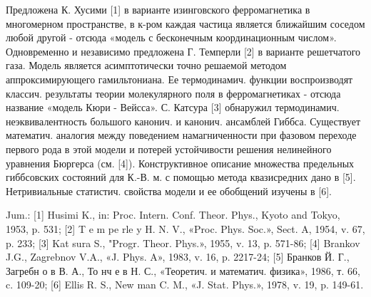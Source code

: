 \documentclass[10pt]{article}
\begin{document}
Предложена К. Хусими [1] в варианте изинговского ферромагнетика в многомерном пространстве, в к-ром каждая частица является ближайшим соседом любой другой - отсюда «модель с бесконечным координационным числом». Одновременно и независимо предложена Г. Темперли [2] в варианте решетчатого газа. Модель является асимптотически точно решаемой методом аппроксимирующего гамильтониана. Ее термодинамич. функции воспроизводят классич. результаты теории молекулярного поля в ферромагнетиках - отсюда название «модель Кюри - Вейсса». С. Катсура [3] обнаружил термодинамич. неэквивалентность большого канонич. и канонич. ансамблей Гиббса. Существует математич. аналогия между поведением намагниченности при фазовом переходе первого рода в этой модели и потерей устойчивости решения нелинейного уравнения Бюргерса (см. [4]). Конструктивное описание множества предельных гиббсовских состояний для К.-В. м. с помощью метода квазисредних дано в [5]. Нетривиальные статистич. свойства модели и ее обобщений изучены в [6].



Jum.: [1] Husimi K., in: Proc. Intern. Conf. Theor. Phys., Kyoto and Tokyo, 1953, p. 531; [2] T e m pe rle y H. N. V., «Proc. Phys. Soc.», Sect. A, 1954, v. 67, p. 233; [3] Kat sura S., "Progr. Theor. Phys.», 1955, v. 13, p. 571-86; [4] Brankov J.G., Zagrebnov V.A., «J. Phys. A», 1983, v. 16, p. 2217-24; [5] Бранков Й. Г., Загребн о в В. А., То нч е в Н. С., «Теоретич. и математич. физика», 1986, т. 66, c. 109-20; [6] Ellis R. S., New man C. M., «J. Stat. Phys.», 1978, v. 19, p. 149-61.
\end{document}
